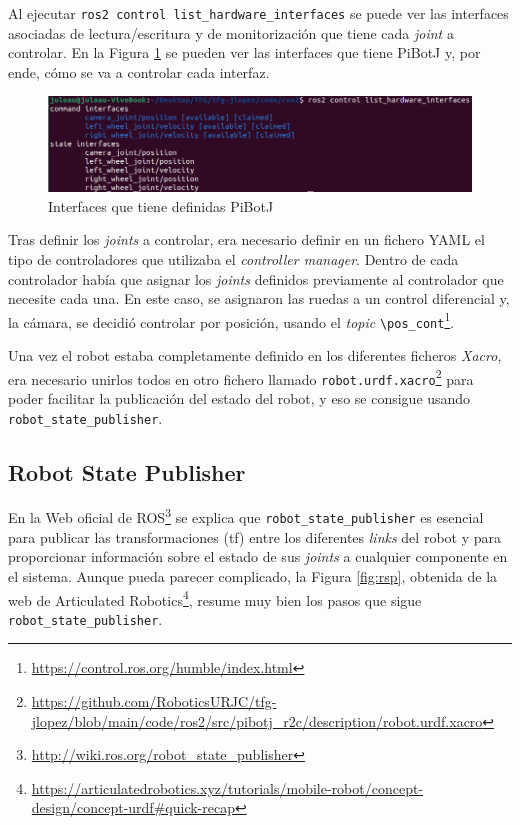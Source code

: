 Al ejecutar \verb|ros2 control list_hardware_interfaces| se puede ver las interfaces asociadas de lectura/escritura y de monitorización que tiene cada \textit{joint} a controlar. En la Figura \ref{fig:ros2control} se pueden ver las interfaces que tiene PiBotJ y, por ende, cómo se va a controlar cada interfaz.

 \begin{figure} [h!]
 	\begin{center}
 		\includegraphics[width=14cm]{figs/cap6/interfaces.png}
 	\end{center}
 	\caption{Interfaces que tiene definidas PiBotJ}
 	\label{fig:ros2control}
 \end{figure}

Tras definir los \textit{joints} a controlar, era necesario definir en un fichero YAML el tipo de controladores que utilizaba el \textit{controller manager}. Dentro de cada controlador había que asignar los \textit{joints} definidos previamente al controlador que necesite cada una. En este caso, se asignaron las ruedas a un control diferencial y, la cámara, se decidió controlar por posición, usando el \textit{topic} \verb|\pos_cont|\footnote{\url{https://control.ros.org/humble/index.html}}.

Una vez el robot estaba completamente definido en los diferentes ficheros \textit{Xacro}, era necesario unirlos todos en otro fichero llamado \verb|robot.urdf.xacro|\footnote{\url{https://github.com/RoboticsURJC/tfg-jlopez/blob/main/code/ros2/src/pibotj_r2c/description/robot.urdf.xacro}} para poder facilitar la publicación del estado del robot, y eso se consigue usando \verb|robot_state_publisher|.
 
\subsection{Robot State Publisher}
\label{subsec:robotstatepublisher}

En la Web oficial de ROS\footnote{\url{http://wiki.ros.org/robot_state_publisher}} se explica que \verb|robot_state_publisher| es esencial para publicar las transformaciones (tf) entre los diferentes \textit{links} del robot y para proporcionar información sobre el estado de sus \textit{joints} a cualquier componente en el sistema. Aunque pueda parecer complicado, la Figura \ref{fig:rsp}, obtenida de la web de Articulated Robotics\footnote{\url{https://articulatedrobotics.xyz/tutorials/mobile-robot/concept-design/concept-urdf\#quick-recap}}, resume muy bien los pasos que sigue \verb|robot_state_publisher|.

